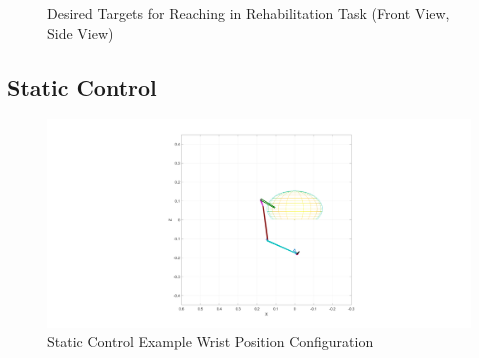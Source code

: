 \begin{figure}[h!]
\begin{subfigure}[b]{0.45\linewidth}
    \end{subfigure}
    \caption{Desired Targets for Reaching in Rehabilitation Task (Front View, Side View)}
    \label{fig:desiredpoints}
\end{figure}

\subsection{Static Control}
\begin{figure}[h!]
\centering
\includegraphics[width=1\textwidth]{Pictures/Controller/StaticControl_WP.png} 
\caption{Static Control Example Wrist Position Configuration} %
\label{fig:SCWP} %
\end{figure}

